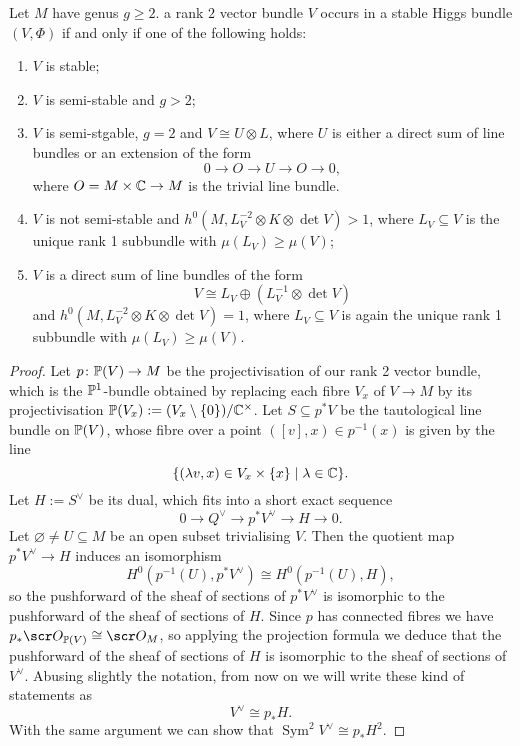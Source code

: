 \documentclass[A4paper, 12pt, british, reqno]{amsart}
\DeclareMathOperator{\Sym}{Sym}
\newcommand{\ot}{\otimes}
\newcommand{\op}{\oplus}
\newcommand{\dual}{^{\vee}}
\begin{document}
\begin{prop}
    Let $M$ have genus $g\geqslant 2$.
    a rank $2$ vector bundle $V$ occurs in a stable Higgs bundle $(V,\Phi)$ if and only if one of the following holds:
    \begin{enumerate}[label=\roman*)]
	\item $V$ is stable;
	\item $V$ is semi-stable and $g>2$;
	\item $V$ is semi-stgable, $g=2$ and $V\cong U\ot L$, where $U$ is either a direct sum of line bundles or an extension of the form
	    \[ 0\to O\to U\to O\to 0, \]
	    where $O=M\times \C\to M$ is the trivial line bundle.
	\item $V$ is not semi-stable and $h^{0}(M,L_{V}^{-2}\ot K\ot \det{V})>1$, where $L_{V}\subseteq V$ is the unique rank 1 subbundle with $\mu(L_{V})\geqslant \mu(V)$;
	\item $V$ is a direct sum of line bundles of the form
	    \[ V\cong L_{V}\op (L_{V}^{-1}\ot \det{V}) \]
	    and $h^{0}(M,L_{V}^{-2}\ot K\ot \det{V})=1$, where $L_{V}\subseteq V$ is again the unique rank 1 subbundle with $\mu(L_{V})\geqslant \mu(V)$.
    \end{enumerate}
    \begin{proof}
	Let $p\colon \P(V)\to M$ be the projectivisation of our rank 2 vector bundle, which is the $\P^{1}$-bundle obtained by replacing each fibre $V_{x}$ of $V\to M$ by its projectivisation $\P(V_{x}):=(V_{x}\setminus \{0\})/\C^{\times}$.
	Let $S\subseteq p^{*}V$ be the tautological line bundle on $\P(V)$, whose fibre over a point $([v],x)\in p^{-1}(x)$ is given by the line
	\[ \{ (\lambda v, x)\in V_{x}\times \{x\}\mid \lambda \in \C \}. \]
	Let $H:=S\dual$ be its dual, which fits into a short exact sequence
	\[ 0\to Q\dual \to p^{*}V\dual \to H \to 0. \]
	Let $\varnothing\neq U\subseteq M$ be an open subset trivialising $V$.
	Then the quotient map $p^{*}V\dual \to H$ induces an isomorphism
	\[ H^{0}(p^{-1}(U),p^{*}V\dual)\cong H^{0}(p^{-1}(U),H), \]
	so the pushforward of the sheaf of sections of $p^{*}V\dual$ is isomorphic to the pushforward of the sheaf of sections of $H$.
	Since $p$ has connected fibres we have $p_{*}\O_{\P(V)}\cong \O_{M}$, so applying the projection formula \cite[Exercise II.5.1.d]{har77} we deduce that the pushforward of the sheaf of sections of $H$ is isomorphic to the sheaf of sections of $V\dual$.
	Abusing slightly the notation, from now on we will write these kind of statements as
	\[ V\dual \cong p_{*}H. \]
	With the same argument we can show that $\Sym^{2}V\dual \cong p_{*}H^{2}$.
    \end{proof}
\end{prop}



\vspace{0.3cm}
\end{document}
